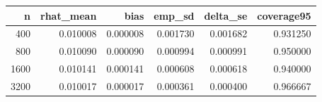 \begin{tabular}{rrrrrr}
\toprule
n & rhat_mean & bias & emp_sd & delta_se & coverage95 \\
\midrule
400 & 0.010008 & 0.000008 & 0.001730 & 0.001682 & 0.931250 \\
800 & 0.010090 & 0.000090 & 0.000994 & 0.000991 & 0.950000 \\
1600 & 0.010141 & 0.000141 & 0.000608 & 0.000618 & 0.940000 \\
3200 & 0.010017 & 0.000017 & 0.000361 & 0.000400 & 0.966667 \\
\bottomrule
\end{tabular}
